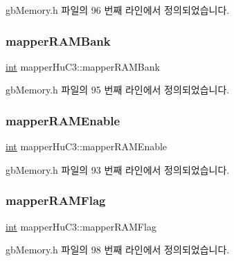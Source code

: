 gb\+Memory.\+h 파일의 96 번째 라인에서 정의되었습니다.

\mbox{\label{structmapper_hu_c3_a75471cab85c2a3fcde2253ae1dfaaf6f}} 
\subsubsection{\texorpdfstring{mapper\+R\+A\+M\+Bank}{mapperRAMBank}}
{\footnotesize\ttfamily \mbox{\hyperlink{_util_8cpp_a0ef32aa8672df19503a49fab2d0c8071}{int}} mapper\+Hu\+C3\+::mapper\+R\+A\+M\+Bank}



gb\+Memory.\+h 파일의 95 번째 라인에서 정의되었습니다.

\mbox{\label{structmapper_hu_c3_a86d9d7ad1d6be7d39f03d2aa5b8c57bc}} 
\subsubsection{\texorpdfstring{mapper\+R\+A\+M\+Enable}{mapperRAMEnable}}
{\footnotesize\ttfamily \mbox{\hyperlink{_util_8cpp_a0ef32aa8672df19503a49fab2d0c8071}{int}} mapper\+Hu\+C3\+::mapper\+R\+A\+M\+Enable}



gb\+Memory.\+h 파일의 93 번째 라인에서 정의되었습니다.

\mbox{\label{structmapper_hu_c3_a25465c1d3261b9b3b0522d258bca79ba}} 
\subsubsection{\texorpdfstring{mapper\+R\+A\+M\+Flag}{mapperRAMFlag}}
{\footnotesize\ttfamily \mbox{\hyperlink{_util_8cpp_a0ef32aa8672df19503a49fab2d0c8071}{int}} mapper\+Hu\+C3\+::mapper\+R\+A\+M\+Flag}



gb\+Memory.\+h 파일의 98 번째 라인에서 정의되었습니다.

